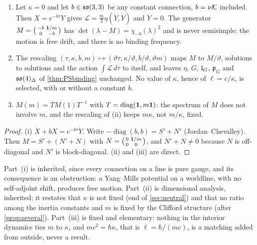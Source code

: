 \begin{proposition}
\label{bf:alone}
\begin{enumerate}[label=(\roman*),leftmargin=2.2em]
\item Let $\kappa=0$ and let $b\in\mathfrak{so}(3,3)$ be any constant connection, $b=\nu\mathcal K$ included. Then $X=e^{-b\tau}Y$ gives
$\mathcal L=\tfrac m2\eta(\dot Y,\dot Y)$ and $\ddot Y=0$. The generator $M=\bigl(\begin{smallmatrix}-b&\mathbf 1/m\\0&-b\end{smallmatrix}\bigr)$ has
$\det(\lambda-M)=\chi_{-b}(\lambda)^2$ and is never semisimple: the motion is free drift, and there is no binding frequency.
\item The rescaling $(\tau,\kappa,b,m)\mapsto(\vartheta\tau,\kappa/\vartheta,b/\vartheta,\vartheta m)$ maps $M$ to $M/\vartheta$, solutions to solutions and
the action $\int\mathcal L\,d\tau$ to itself, and leaves $\eta$, $G$, $\mathfrak l_G$, $\mathfrak p_G$ and $\mathfrak{so}(4)_\Delta$ of \cref{thm:PSbinding} unchanged. No value of $\kappa$, hence of
$\ell=c/\kappa$, is selected, with or without a constant $b$.
\item $M(m)=TM(1)T^{-1}$ with $T=\operatorname{diag}(\mathbf 1,m\mathbf 1)$: the spectrum of $M$ does not involve $m$, and the rescaling of (ii) keeps $m\kappa$,
not $m/\kappa$, fixed.
\end{enumerate}
\end{proposition}

\begin{proof}
(i) $\dot X+bX=e^{-b\tau}\dot Y$. Write $-\operatorname{diag}(b,b)=S'+N'$ (Jordan--Chevalley). Then $M=S'+(N'+N)$ with
$N=\bigl(\begin{smallmatrix}0&\mathbf 1/m\\0&0\end{smallmatrix}\bigr)$, and $N'+N\neq0$ because $N$ is off-diagonal and $N'$ is block-diagonal. (ii) and (iii) are
direct.
\end{proof}

Part~(i) is inherited, since every connection on a line is pure gauge, and its consequence is an obstruction: a Yang--Mills potential on a
worldline, with no self-adjoint shift, produces free motion. Part~(ii) is dimensional analysis, inherited; it restates that $\kappa$ is not
fixed (end of \cref{sec:neutral}) and that no ratio among the inertia constants and $m$ is fixed by the Clifford structure (after
\cref{prop:several}). Part~(iii) is fixed and elementary: nothing in the interior dynamics ties $m$ to $\kappa$, and $mc^2=\hbar\kappa$, that is
$\ell=\hbar/(mc)$, is a matching added from outside, never a result.

